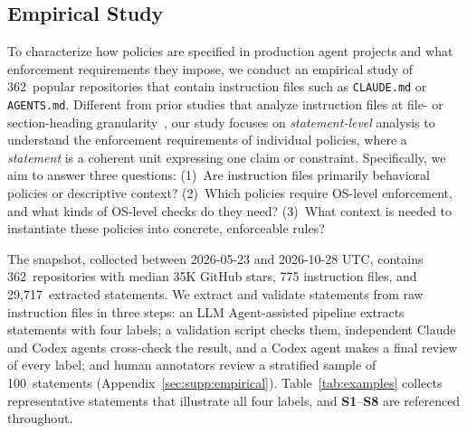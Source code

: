 \subsection{Empirical Study}
\label{sec:empirical}

To characterize how policies are specified in production agent projects and what enforcement requirements they impose, we conduct an empirical study of 362~popular repositories that contain instruction files such as \texttt{CLAUDE.md} or \texttt{AGENTS.md}.
Different from prior studies that analyze instruction files at file- or section-heading granularity~\cite{chatlatanagulchai2025manifests,chatlatanagulchai2025agentreadmes,santos2025claudeconfig,lulla2026agentsmd}, our study focuses on \emph{statement-level} analysis to understand the enforcement requirements of individual policies, where a \emph{statement} is a coherent unit expressing one claim or constraint.
Specifically, we aim to answer three questions: (1)~Are instruction files primarily behavioral policies or descriptive context? (2)~Which policies require OS-level enforcement, and what kinds of OS-level checks do they need? (3)~What context is needed to instantiate these policies into concrete, enforceable rules?

 The snapshot, collected between 2026-05-23 and 2026-10-28 UTC, contains 362~repositories with median 35K GitHub stars, 775 instruction files, and 29{,}717~extracted statements.
We extract and validate statements from raw instruction files in three steps: an LLM Agent-assisted pipeline extracts statements with four labels; a validation script checks them, independent Claude and Codex agents cross-check the result, and a Codex agent makes a final review of every label; and human annotators review a stratified sample of 100~statements (Appendix~\ref{sec:supp:empirical}).
Table~\ref{tab:examples} collects representative statements that illustrate all four labels, and \textbf{S1}--\textbf{S8} are referenced throughout.

